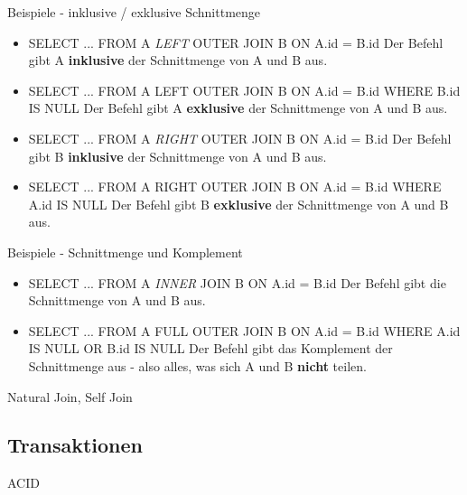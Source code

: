 Beispiele - inklusive / exklusive Schnittmenge
\begin{itemize}
	\item SELECT ... FROM A {\it LEFT} OUTER JOIN B ON A.id = B.id
	Der Befehl gibt A {\bf inklusive} der Schnittmenge von A und B aus.
	\item SELECT ... FROM A LEFT OUTER JOIN B ON A.id = B.id WHERE B.id IS NULL
	Der Befehl gibt A {\bf exklusive} der Schnittmenge von A und B aus.
	\item SELECT ... FROM A {\it RIGHT} OUTER JOIN B ON A.id = B.id
	Der Befehl gibt B {\bf inklusive} der Schnittmenge von A und B aus.
	\item SELECT ... FROM A RIGHT OUTER JOIN B ON A.id = B.id WHERE A.id IS NULL
	Der Befehl gibt B {\bf exklusive} der Schnittmenge von A und B aus.
\end{itemize}

Beispiele - Schnittmenge und Komplement
\begin{itemize}
	\item SELECT ... FROM A {\it INNER} JOIN B ON A.id = B.id
	Der Befehl gibt die Schnittmenge von A und B aus.
	\item SELECT ... FROM A FULL OUTER JOIN B ON A.id = B.id WHERE A.id IS NULL OR B.id IS NULL
	Der Befehl gibt das Komplement der Schnittmenge aus - also alles, was sich A und B {\bf nicht} teilen.
\end{itemize}

Natural Join, Self Join

\subsection{Transaktionen}

ACID

